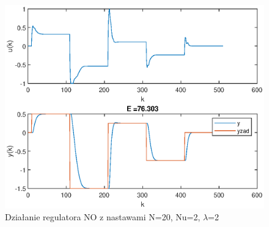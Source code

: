 		\begin{figure}[h!]
			\centering
			\includegraphics[width=0.8\linewidth]{img/NO.eps}
			\caption{Działanie regulatora NO z nastawami N=20, Nu=2, $\lambda$=2}
			\label{fig:NO}
		\end{figure}